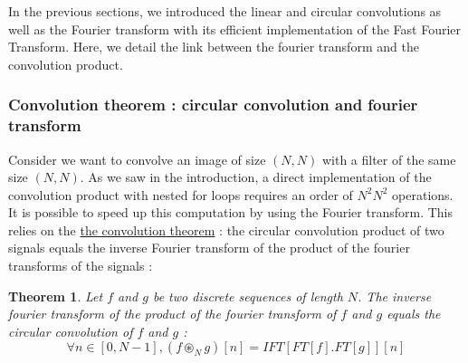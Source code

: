 \documentclass[a4paper,10pt,twoside]{article}
\newtheorem{myTheorem}{Theorem}
\begin{document}
In the previous sections, we introduced the linear and circular convolutions as well as the Fourier transform with its efficient implementation of the Fast Fourier Transform. Here, we detail the link between the fourier transform and the convolution product. 

\subsubsection{Convolution theorem : circular convolution and fourier transform}

Consider we want to convolve an image of size $(N,N)$ with a filter of the same size $(N,N)$. As we saw in the introduction, a direct implementation of the convolution product with nested for loops requires an order of $N^2 N^2$ operations. It is possible to speed up this computation by using the Fourier transform. This relies on the \href{http://en.wikipedia.org/wiki/Convolution_theorem}{the convolution theorem} : the circular convolution product of two signals equals the inverse Fourier transform of the product of the fourier transforms of the signals :
\begin{myTheorem}
Let $f$ and $g$ be two discrete sequences of length $N$. The inverse fourier transform of the product of the fourier transform of $f$ and $g$ equals the circular convolution of $f$ and $g$ :
\begin{equation*}
\forall n \in [0,N-1], (f \circledast_N g)[n] = IFT[ FT[f] . FT[g] ][n]
\end{equation*}
\end{myTheorem}
\end{document}
